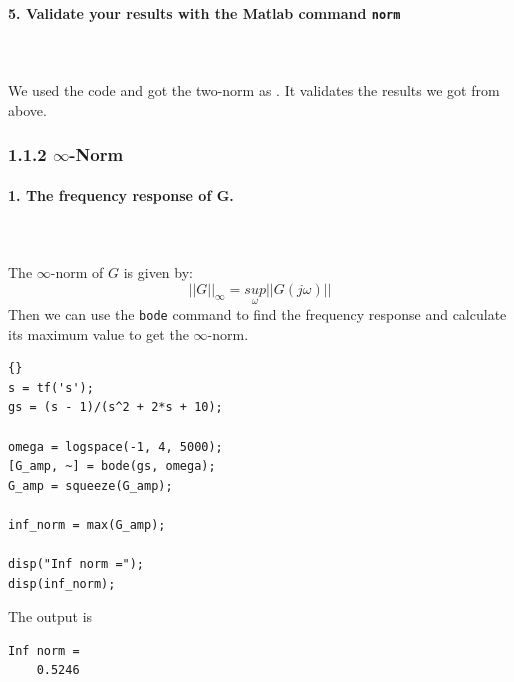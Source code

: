 \documentclass{article}
\begin{document}
\paragraph{5. Validate your results with the Matlab command \texttt{norm}}~\\~\\
We used the code  and got the two-norm as . It validates the results we got from above.

\subsubsection*{1.1.2 $\infty$-Norm}
\paragraph{1. The frequency response of G.}~\\~\\
The $\infty$-norm of $G$ is given by:
\[||G||_\infty= \underset{\omega}{sup} ||G(j\omega)||\]
Then we can use the \verb|bode| command to find the frequency response and calculate its maximum value to get the $\infty$-norm.
\begin{lstlisting}{}
s = tf('s');
gs = (s - 1)/(s^2 + 2*s + 10);

omega = logspace(-1, 4, 5000);
[G_amp, ~] = bode(gs, omega);
G_amp = squeeze(G_amp);

inf_norm = max(G_amp);

disp("Inf norm =");
disp(inf_norm);
\end{lstlisting}
The output is 
\begin{lstlisting}[numbers=none]
Inf norm =
    0.5246
\end{lstlisting}
\end{document}
